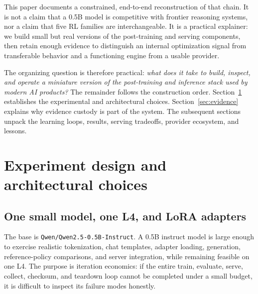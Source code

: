 \documentclass[10pt]{article}
\begin{document}
This paper documents a constrained, end-to-end reconstruction of that chain. It is not a claim that a 0.5B model is competitive with frontier reasoning systems, nor a claim that five RL families are interchangeable. It is a practical explainer: we build small but real versions of the post-training and serving components, then retain enough evidence to distinguish an internal optimization signal from transferable behavior and a functioning engine from a usable provider.

The organizing question is therefore practical: \emph{what does it take to build, inspect, and operate a miniature version of the post-training and inference stack used by modern AI products?} The remainder follows the construction order. Section~\ref{sec:design} establishes the experimental and architectural choices. Section~\ref{sec:evidence} explains why evidence custody is part of the system. The subsequent sections unpack the learning loops, results, serving tradeoffs, provider ecosystem, and lessons.

\begin{center}
\end{center}

\section{Experiment design and architectural choices}\label{sec:design}
\subsection{One small model, one L4, and LoRA adapters}
The base is \texttt{Qwen/Qwen2.5-0.5B-Instruct}. A 0.5B instruct model is large enough to exercise realistic tokenization, chat templates, adapter loading, generation, reference-policy comparisons, and server integration, while remaining feasible on one L4. The purpose is iteration economics: if the entire train, evaluate, serve, collect, checksum, and teardown loop cannot be completed under a small budget, it is difficult to inspect its failure modes honestly.
\end{document}
